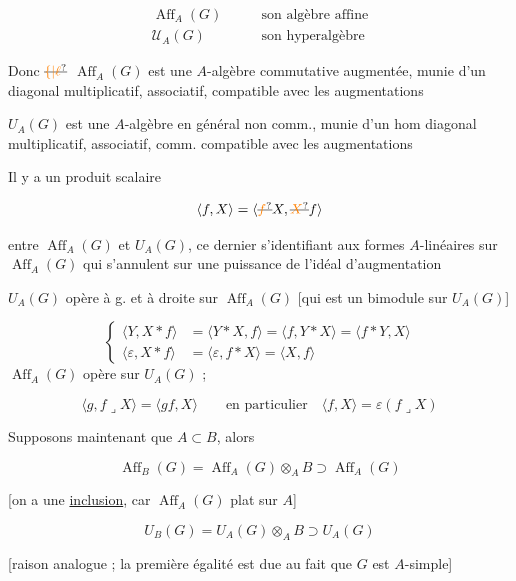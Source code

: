 \[
\begin{aligned}
\operatorname{Aff}_A(G)&\qquad\text{son algèbre affine}\\
\mathcal U_A(G)&\qquad\text{son hyperalgèbre}
\end{aligned}
\]

Donc $\deleted{\unsure{\{|\ell}}$ $\operatorname{Aff}_A(G)$ est une $A$-algèbre commutative augmentée, munie d'un  diagonal multiplicatif, associatif, compatible avec les augmentations

$U_A(G)$ est une $A$-algèbre en général non comm., munie d'un hom diagonal multiplicatif, associatif, comm. compatible avec les augmentations

Il y a un produit scalaire

\[
\langle f,X\rangle=\langle\deleted{\unsure{f}}X,\deleted{\unsure{X}}f\rangle
\]

entre $\operatorname{Aff}_A(G)$ et $U_A(G)$, ce dernier s'identifiant aux formes $A$-linéaires sur $\operatorname{Aff}_A(G)$ qui s'annulent sur une puissance de l'idéal d'augmentation

$U_A(G)$ opère à g. et à droite sur $\operatorname{Aff}_A(G)$ [qui est un bimodule sur $U_A(G)$]

\[
\left\{\begin{aligned}
\langle Y,X*f\rangle&=\langle Y*X,f\rangle=\langle f,Y*X\rangle=\langle f*Y,X\rangle\\
\langle\varepsilon,X*f\rangle&=\langle\varepsilon,f*X\rangle=\langle X,f\rangle
\end{aligned}\right.
\]
$\operatorname{Aff}_A(G)$ opère  sur $U_A(G)$ ;   

\[
\langle g,f\mathbin{\lrcorner}X\rangle=\langle gf,X\rangle
\qquad\text{en particulier}\quad\langle f,X\rangle=\varepsilon(f\mathbin{\lrcorner}X)
\]

Supposons maintenant que $A\subset B$, alors

\[
\operatorname{Aff}_B(G)=\operatorname{Aff}_A(G)\otimes_A B\supset\operatorname{Aff}_A(G)
\]

[on a une \uline{inclusion}, car $\operatorname{Aff}_A(G)$ plat sur $A$]

\[
U_B(G)=U_A(G)\otimes_A B\supset U_A(G)
\]

[raison analogue ; la première égalité est due au fait que $G$ est $A$-simple]

